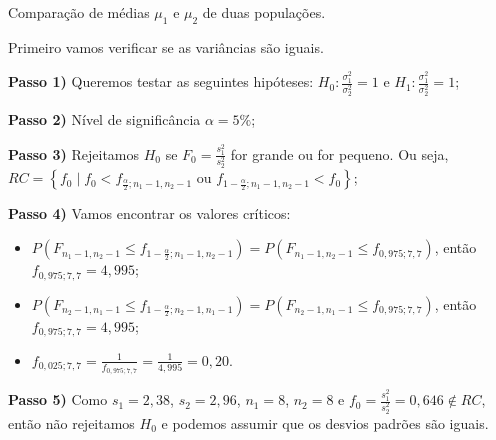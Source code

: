 \documentclass[9pt]{beamer}
\begin{document}
\begin{frame}{Comparação de médias $\mu_1$ e $\mu_2$ de duas populações.}

Primeiro vamos verificar se as variâncias são iguais.

	\textbf{Passo 1)} Queremos testar as seguintes hipóteses: $H_0: \frac{\sigma_1^2}{\sigma_2^2} = 1$ e $H_1: \frac{\sigma_1^2}{\sigma_2^2} = 1$;
	
	\textbf{Passo 2)} Nível de significância $\alpha=5\%$;
	
	\textbf{Passo 3)} Rejeitamos $H_0$ se $F_0 = \frac{s_1^2}{s_2^2}$ for grande ou for pequeno. Ou seja, $RC = \left\{ f_0 \mid f_0 < f_{\frac{\alpha}{2}; n_1-1, n_2-1} \mbox{ ou } f_{1-\frac{\alpha}{2};n_1-1, n_2-1} < f_0 \right\}$;

	\textbf{Passo 4)} Vamos encontrar os valores críticos:
	\begin{itemize}
		\item $P\left( F_{n_1-1, n_2-1} \leq f_{1-\frac{\alpha}{2};n_1-1, n_2-1} \right) = P\left( F_{n_1-1, n_2-1} \leq f_{0,975;7, 7} \right)$, então $f_{0,975;7, 7} = 4,995$;
		\item $P\left( F_{n_2-1, n_1-1} \leq f_{1-\frac{\alpha}{2};n_2-1, n_1-1} \right) = P\left( F_{n_2-1, n_1-1} \leq f_{0,975;7, 7} \right)$, então $f_{0,975;7, 7} = 4,995$;
		\item $f_{0,025; 7,7} = \frac{1}{ f_{0,975; 7, 7} } = \frac{1}{4,995} = 0,20$.
	\end{itemize}

	\textbf{Passo 5)} Como $s_1 = 2,38$, $s_2 = 2,96$, $n_1=8$, $n_2=8$ e $f_0 = \frac{s_1^2}{s_2^2} = 0,646 \not\in RC$, então não rejeitamos $H_0$ e podemos assumir que os desvios padrões são iguais.
\end{frame}
\end{document}
